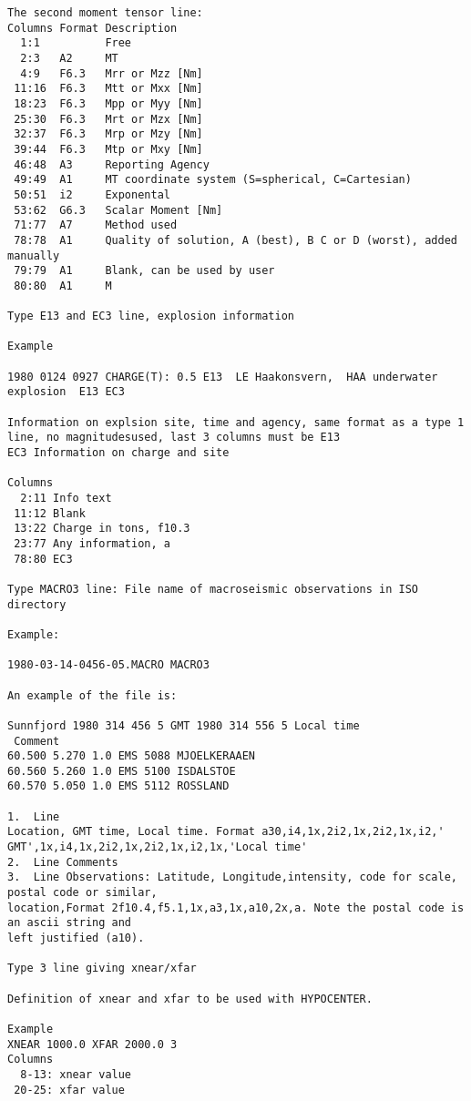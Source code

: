 \begin{verbatim}
The second moment tensor line:
Columns Format Description
  1:1          Free 
  2:3   A2     MT
  4:9   F6.3   Mrr or Mzz [Nm]
 11:16  F6.3   Mtt or Mxx [Nm]
 18:23  F6.3   Mpp or Myy [Nm]
 25:30  F6.3   Mrt or Mzx [Nm]
 32:37  F6.3   Mrp or Mzy [Nm]
 39:44  F6.3   Mtp or Mxy [Nm]
 46:48  A3     Reporting Agency
 49:49  A1     MT coordinate system (S=spherical, C=Cartesian)
 50:51  i2     Exponental
 53:62  G6.3   Scalar Moment [Nm]
 71:77  A7     Method used
 78:78  A1     Quality of solution, A (best), B C or D (worst), added manually
 79:79  A1     Blank, can be used by user
 80:80  A1     M

Type E13 and EC3 line, explosion information 

Example  

1980 0124 0927 CHARGE(T): 0.5 E13  LE Haakonsvern,  HAA underwater explosion  E13 EC3  

Information on explsion site, time and agency, same format as a type 1 line, no magnitudesused, last 3 columns must be E13 
EC3 Information on charge and site 

Columns 
  2:11 Info text 
 11:12 Blank 
 13:22 Charge in tons, f10.3
 23:77 Any information, a
 78:80 EC3 

Type MACRO3 line: File name of macroseismic observations in ISO directory 

Example: 

1980-03-14-0456-05.MACRO MACRO3 

An example of the file is: 

Sunnfjord 1980 314 456 5 GMT 1980 314 556 5 Local time
 Comment 
60.500 5.270 1.0 EMS 5088 MJOELKERAAEN 
60.560 5.260 1.0 EMS 5100 ISDALSTOE 
60.570 5.050 1.0 EMS 5112 ROSSLAND 

1.  Line 
Location, GMT time, Local time. Format a30,i4,1x,2i2,1x,2i2,1x,i2,'
GMT',1x,i4,1x,2i2,1x,2i2,1x,i2,1x,'Local time'
2.  Line Comments 
3.  Line Observations: Latitude, Longitude,intensity, code for scale, postal code or similar,
location,Format 2f10.4,f5.1,1x,a3,1x,a10,2x,a. Note the postal code is an ascii string and
left justified (a10). 

Type 3 line giving xnear/xfar 

Definition of xnear and xfar to be used with HYPOCENTER. 

Example
XNEAR 1000.0 XFAR 2000.0 3 
Columns
  8-13: xnear value
 20-25: xfar value 


\end{verbatim}
